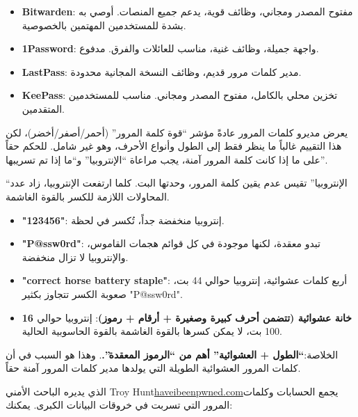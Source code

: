 
\begin{itemize}
  \item \textbf{Bitwarden}: مفتوح المصدر ومجاني، وظائف قوية، يدعم جميع المنصات. أوصي به بشدة للمستخدمين المهتمين بالخصوصية.
  \item \textbf{1Password}: واجهة جميلة، وظائف غنية، مناسب للعائلات والفرق. مدفوع.
  \item \textbf{LastPass}: مدير كلمات مرور قديم، وظائف النسخة المجانية محدودة.
  \item \textbf{KeePass}: تخزين محلي بالكامل، مفتوح المصدر ومجاني. مناسب للمستخدمين المتقدمين.
\end{itemize}


يعرض مديرو كلمات المرور عادةً مؤشر “قوة كلمة المرور” (أحمر/أصفر/أخضر)، لكن هذا التقييم غالباً ما ينظر فقط إلى الطول وأنواع الأحرف، وهو غير شامل. للحكم حقاً على ما إذا كانت كلمة المرور آمنة، يجب مراعاة “الإنتروبيا” و“ما إذا تم تسريبها”.


“الإنتروبيا” تقيس عدم يقين كلمة المرور، وحدتها البت. كلما ارتفعت الإنتروبيا، زاد عدد المحاولات اللازمة للكسر بالقوة الغاشمة.

\begin{itemize}
  \item \textbf{"123456"}: إنتروبيا منخفضة جداً، تُكسر في لحظة.
  \item \textbf{"P@ssw0rd"}: تبدو معقدة، لكنها موجودة في كل قوائم هجمات القاموس، والإنتروبيا لا تزال منخفضة.
  \item \textbf{"correct horse battery staple"}: أربع كلمات عشوائية، إنتروبيا حوالي 44 بت، صعوبة الكسر تتجاوز بكثير "P@ssw0rd".
  \item \textbf{16 خانة عشوائية (تتضمن أحرف كبيرة وصغيرة + أرقام + رموز)}: إنتروبيا حوالي 100 بت، لا يمكن كسرها بالقوة الغاشمة بالقوة الحاسوبية الحالية.
\end{itemize}

الخلاصة:\textbf{“الطول + العشوائية” أهم من “الرموز المعقدة”.}. وهذا هو السبب في أن كلمات المرور العشوائية الطويلة التي يولدها مدير كلمات المرور آمنة حقاً.


الذي يديره الباحث الأمني Troy Hunt\href{https://haveibeenpwned.com}{haveibeenpwned.com}يجمع الحسابات وكلمات المرور التي تسربت في خروقات البيانات الكبرى. يمكنك:

